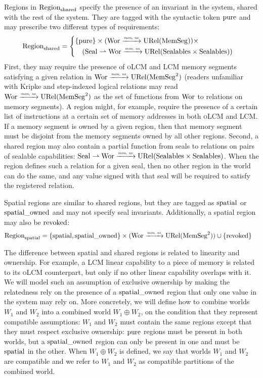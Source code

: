 \documentclass[acmsmall,screen]{acmart}\settopmatter{}
\renewcommand{\MemSeg}{\shareddom{MemSeg}}
\renewcommand{\SealableCaps}{\shareddom{Sealables}}
\newcommand{\trgcm}{\textsc{LCM}}
\newcommand{\srccm}{\textsc{oLCM}}
\begin{document}
Regions in $\mathrm{Region}_\mathrm{shared}$ specify the presence of an invariant in the system, shared with the rest of the system.
They are tagged with the syntactic token $\mathrm{pure}$ and may prescribe two different types of requirements:
\begin{align*}
  \Regionh &= 
             \left\{\begin{multlined}
               \{\pure \} \times (\Wor \monnefun \URel{\MemSeg}) \times \\
               (\Seal \parfun \Wor \monnefun \URel{\SealableCaps \times \SealableCaps})
             \end{multlined}\right.
\end{align*}
First, they may require the presence of \srccm{} and \trgcm{} memory segments satisfying a given relation in $\Wor \monnefun \URel{\MemSeg^2}$ (readers unfamiliar with Kripke and step-indexed logical relations may read $\Wor \monnefun \URel{\MemSeg^2}$ as the set of functions from $\mathrm{Wor}$ to relations on memory segments).
A region might, for example, require the presence of a certain list of instructions at a certain set of memory addresses in both \srccm{} and \trgcm{}.
If a memory segment is owned by a given region, then that memory segment must be disjoint from the memory segments owned by all other regions.
Second, a shared region may also contain a partial function from seals to relations on pairs of sealable capabilities: $\Seal \parfun \Wor \monnefun \URel{\SealableCaps \times \SealableCaps}$.
When the region defines such a relation for a given seal, then no other region in the world can do the same, and any value signed with that seal will be required to satisfy the registered relation.

Spatial regions are similar to shared regions, but they are tagged as $\mathrm{spatial}$ or $\mathrm{spatial\_owned}$ and may not specify seal invariants.
Additionally, a spatial region may also be $\mathrm{revoked}$:
\begin{align*}
  \Regions &={}
             \begin{multlined}
               \{\spatial,\spatialo \} \times (\Wor \monnefun \URel{\MemSeg^2}) \cup{} \{\revoked\}
             \end{multlined}
\end{align*}

The difference between spatial and shared regions is related to linearity and ownership.
For example, a \trgcm{} linear capability to a piece of memory is related to its \srccm{} counterpart, but only if no other linear capability overlaps with it.
We will model such an assumption of exclusive ownership by making the relatedness rely on the presence of a $\mathrm{spatial\_owned}$ region that only one value in the system may rely on.
More concretely, we will define how to combine worlds $W_1$ and $W_2$ into a combined world $W_1 \oplus W_2$, on the condition that they represent compatible assumptions: $W_1$ and $W_2$ must contain the same regions except that they must respect exclusive ownership: $\mathrm{pure}$ regions must be present in both worlds, but a $\mathrm{spatial\_owned}$ region can only be present in one and must be $\mathrm{spatial}$ in the other.
When $W_1 \oplus W_2$ is defined, we say that worlds $W_1$ and $W_2$ are compatible and we refer to $W_1$ and $W_2$ as compatible partitions of the combined world.
\end{document}
